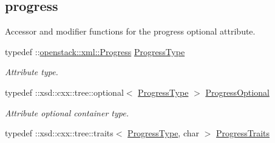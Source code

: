 \subsection*{progress}
\label{_amgrp3c709b10a5d47ba33d85337dd9110917}
Accessor and modifier functions for the progress optional attribute. \begin{DoxyCompactItemize}
\item 
\hypertarget{classopenstack_1_1xml_1_1Image_a9d2138bda564b8adbaad58e0f8d80387}{
typedef ::\hyperlink{classopenstack_1_1xml_1_1Progress}{openstack::xml::Progress} \hyperlink{classopenstack_1_1xml_1_1Image_a9d2138bda564b8adbaad58e0f8d80387}{ProgressType}}
\label{classopenstack_1_1xml_1_1Image_a9d2138bda564b8adbaad58e0f8d80387}

\begin{DoxyCompactList}\small\item\em Attribute type. \item\end{DoxyCompactList}\item 
\hypertarget{classopenstack_1_1xml_1_1Image_a2eccdcee5ec73e85036a773756a4df0b}{
typedef ::xsd::cxx::tree::optional$<$ \hyperlink{classopenstack_1_1xml_1_1Progress}{ProgressType} $>$ \hyperlink{classopenstack_1_1xml_1_1Image_a2eccdcee5ec73e85036a773756a4df0b}{ProgressOptional}}
\label{classopenstack_1_1xml_1_1Image_a2eccdcee5ec73e85036a773756a4df0b}

\begin{DoxyCompactList}\small\item\em Attribute optional container type. \item\end{DoxyCompactList}\item 
\hypertarget{classopenstack_1_1xml_1_1Image_acc1a6a60cf6d8444261aec12121e86e2}{
typedef ::xsd::cxx::tree::traits$<$ \hyperlink{classopenstack_1_1xml_1_1Progress}{ProgressType}, char $>$ \hyperlink{classopenstack_1_1xml_1_1Image_acc1a6a60cf6d8444261aec12121e86e2}{ProgressTraits}}
\label{classopenstack_1_1xml_1_1Image_acc1a6a60cf6d8444261aec12121e86e2}


\end{DoxyCompactItemize}
